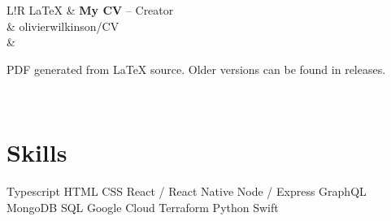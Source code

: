 \documentclass[a4paper,12pt]{article}
\newcommand\VerticalRule{\color{lightgray}\vrule width 0.5pt}
\begin{document}
\begin{tabular}{L!{\VerticalRule}R}
	LaTeX        & {\bf My CV}  --  Creator                                                           \\
	             &  \hspace{0.1mm} olivierwilkinson/CV                                   \\
	             & \begin{items}
		               \item PDF generated from LaTeX source. Older versions can be found in releases.
	               \end{items}     \\
\end{tabular}

\section*{Skills}
 Typescript \hspace{1.5mm}
 HTML \hspace{1.5mm}
 CSS \hspace{1.5mm}
 React / React Native \hspace{1.5mm}
 Node / Express \hspace{1.5mm}
 GraphQL \hspace{1.5mm} \\
 MongoDB \hspace{1.5mm}
 SQL \hspace{1.5mm}
 Google Cloud \hspace{1.5mm}
 Terraform \hspace{1.5mm}
 Python \hspace{1.5mm}
 Swift \hspace{1.5mm}
\end{document}
